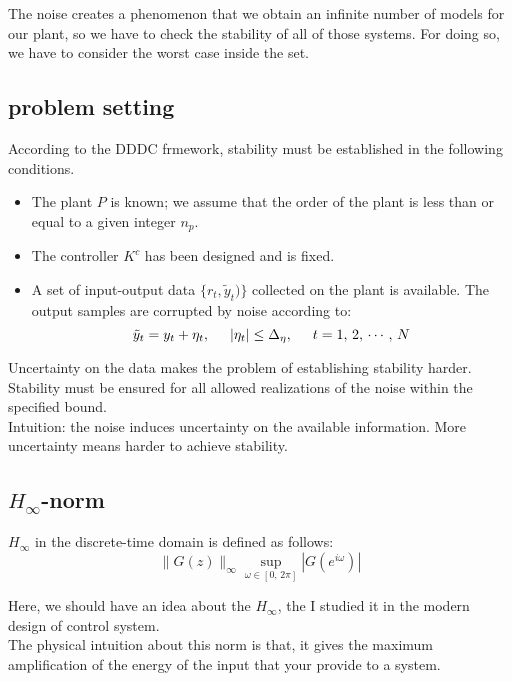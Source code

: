 The noise creates a phenomenon that we obtain an infinite number of models for our plant, so we have to check the stability of all of those systems. For doing so, we have to consider the worst case inside the set.



\subsection{problem setting}

According to the DDDC frmework, stability must be established in the following conditions.
\begin{itemize}
    \item The plant $P$ is known; we assume that the order of the plant is less than or equal to a given integer $n_p$.
    \item The controller $K^c$ has been designed and is fixed.
    \item A set of input-output data $\{r_t,\tilde{y}_t)\}$ collected on the plant is available. The output samples are corrupted by noise according to:
    \[
    \tilde{y}_t = y_t + \eta_t, \hspace{0.5cm} |\eta_t|\leq \Delta_\eta, \hspace{0.5cm} t=1,\,2,\,\cdots,\,N
    \]
\end{itemize}

Uncertainty on the data makes the problem of establishing stability harder. Stability must be ensured for all allowed realizations of the noise within the specified
bound.\\

Intuition: the noise induces uncertainty on the available information.
More uncertainty means harder to achieve stability.

\subsection{$H_\infty$-norm}
$H_\infty$ in the discrete-time domain is defined as follows:
\[
\|G(z)\|_\infty  \sup\limits_{\omega \in [0,\,2\pi]} |G(e^{i\omega})|
\]
\begin{factbox}
Here, we should have an idea about the $H_\infty$, the I studied it in the modern design of control system.\\

The physical intuition about this norm is that, it gives the maximum amplification of the energy of the input that your provide to a system.
\end{factbox}

